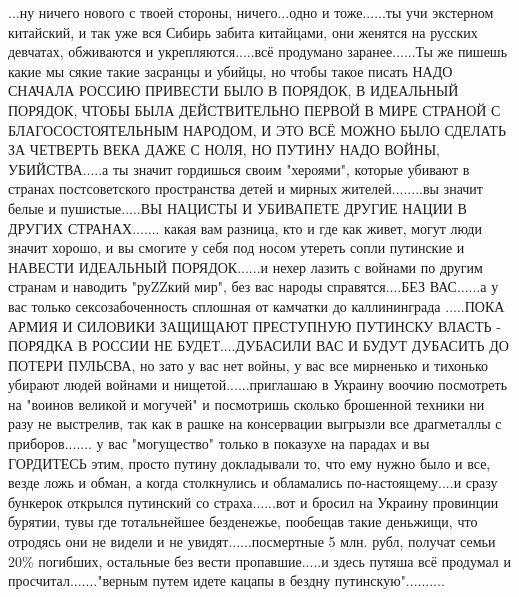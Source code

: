  
 
 
 
 

...ну ничего нового с твоей стороны, ничего...одно и тоже......ты учи экстерном
китайский, и так уже вся Сибирь забита китайцами, они женятся на русских
девчатах, обживаются и укрепляются.....всё продумано заранее......Ты же пишешь
какие мы сякие такие засранцы и убийцы, но чтобы такое писать НАДО СНАЧАЛА
РОССИЮ ПРИВЕСТИ БЫЛО В ПОРЯДОК, В ИДЕАЛЬНЫЙ ПОРЯДОК, ЧТОБЫ БЫЛА ДЕЙСТВИТЕЛЬНО
ПЕРВОЙ В МИРЕ СТРАНОЙ С БЛАГОСОСТОЯТЕЛЬНЫМ НАРОДОМ, И ЭТО ВСЁ МОЖНО БЫЛО
СДЕЛАТЬ ЗА ЧЕТВЕРТЬ ВЕКА ДАЖЕ С НОЛЯ, НО ПУТИНУ НАДО ВОЙНЫ, УБИЙСТВА.....а ты
значит гордишься своим "хероями", которые убивают в странах постсоветского
пространства детей и мирных жителей........вы значит белые и пушистые.....ВЫ
НАЦИСТЫ И УБИВАПЕТЕ ДРУГИЕ НАЦИИ В ДРУГИХ СТРАНАХ....... какая вам разница, кто
и где как живет, могут люди значит хорошо, и вы смогите у себя под носом
утереть сопли путинские и НАВЕСТИ ИДЕАЛЬНЫЙ ПОРЯДОК......и нехер лазить с
войнами по другим странам и наводить "руZZкий мир", без вас народы
справятся....БЕЗ ВАС......а у вас только сексозабоченность сплошная от камчатки
до каллининграда .....ПОКА АРМИЯ И СИЛОВИКИ ЗАЩИЩАЮТ ПРЕСТУПНУЮ ПУТИНСКУ ВЛАСТЬ
- ПОРЯДКА В РОССИИ НЕ БУДЕТ....ДУБАСИЛИ ВАС И БУДУТ ДУБАСИТЬ ДО ПОТЕРИ ПУЛЬСВА,
но зато у вас нет войны, у вас все мирненько и тихонько убирают людей войнами и
нищетой......приглашаю в Украину воочию посмотреть на "воинов великой и
могучей" и посмотришь сколько брошенной техники ни разу не выстрелив, так как в
рашке на консервации выгрызли все драгметаллы с приборов....... у вас
"могущество" только в показухе на парадах и вы ГОРДИТЕСЬ этим, просто путину
докладывали то, что ему нужно было и все, везде ложь и обман, а когда
столкнулись и обламались по-настоящему....и сразу бункерок открылся путинский
со страха......вот и бросил на Украину провинции бурятии, тувы где тотальнейшее
безденежье, пообещав такие деньжищи, что отродясь они не видели и не
увидят......посмертные 5 млн. рубл, получат семьи 20\% погибших, остальные без
вести пропавшие.....и здесь путяша всё продумал и просчитал......."верным путем
идете кацапы в бездну путинскую"..........
